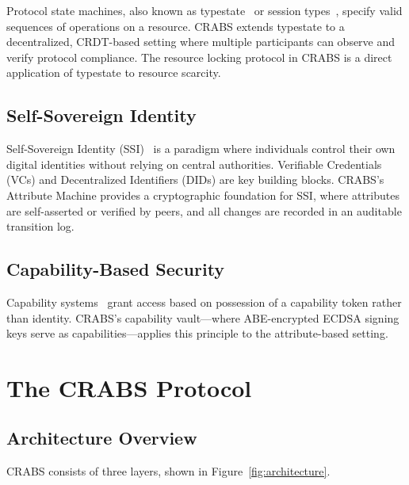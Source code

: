 \documentclass[11pt,a4paper]{article}
\begin{document}
Protocol state machines, also known as typestate~\cite{deline2004typestate} or session types~\cite{honda1998session}, specify valid sequences of operations on a resource. CRABS extends typestate to a decentralized, CRDT-based setting where multiple participants can observe and verify protocol compliance. The resource locking protocol in CRABS is a direct application of typestate to resource scarcity.

\subsection{Self-Sovereign Identity}

Self-Sovereign Identity (SSI)~\cite{allen2016ssi} is a paradigm where individuals control their own digital identities without relying on central authorities. Verifiable Credentials (VCs) and Decentralized Identifiers (DIDs) are key building blocks. CRABS's Attribute Machine provides a cryptographic foundation for SSI, where attributes are self-asserted or verified by peers, and all changes are recorded in an auditable transition log.

\subsection{Capability-Based Security}

Capability systems~\cite{dennis1966capability} grant access based on possession of a capability token rather than identity. CRABS's capability vault---where ABE-encrypted ECDSA signing keys serve as capabilities---applies this principle to the attribute-based setting.

\section{The CRABS Protocol}

\subsection{Architecture Overview}

CRABS consists of three layers, shown in Figure~\ref{fig:architecture}.
\end{document}

